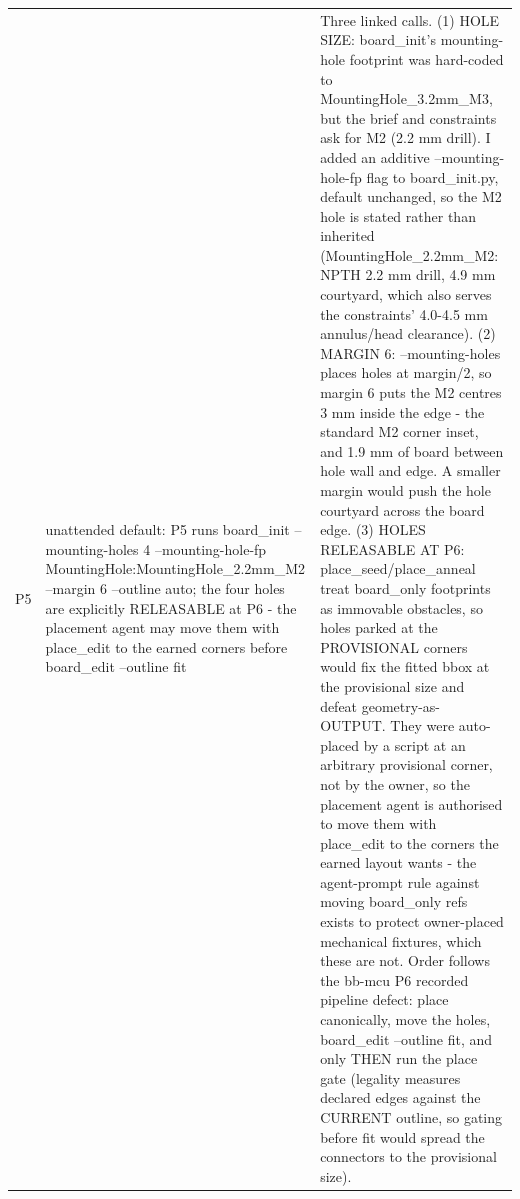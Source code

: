 \documentclass[11pt,a4paper]{article}
\begin{document}
{\begin{longtable}{lp{5.2cm}p{7.2cm}}
P5 & unattended default: P5 runs board\_init --mounting-holes 4 --mounting-hole-fp MountingHole:MountingHole\_2.2mm\_M2 --margin 6 --outline auto; the four holes are explicitly RELEASABLE at P6 - the placement agent may move them with place\_edit to the earned corners before board\_edit --outline fit & Three linked calls. (1) HOLE SIZE: board\_init's mounting-hole footprint was hard-coded to MountingHole\_3.2mm\_M3, but the brief and constraints ask for M2 (2.2 mm drill). I added an additive --mounting-hole-fp flag to board\_init.py, default unchanged, so the M2 hole is stated rather than inherited (MountingHole\_2.2mm\_M2: NPTH 2.2 mm drill, 4.9 mm courtyard, which also serves the constraints' 4.0-4.5 mm annulus/head clearance). (2) MARGIN 6: --mounting-holes places holes at margin/2, so margin 6 puts the M2 centres 3 mm inside the edge - the standard M2 corner inset, and 1.9 mm of board between hole wall and edge. A smaller margin would push the hole courtyard across the board edge. (3) HOLES RELEASABLE AT P6: place\_seed/place\_anneal treat board\_only footprints as immovable obstacles, so holes parked at the PROVISIONAL corners would fix the fitted bbox at the provisional size and defeat geometry-as-OUTPUT. They were auto-placed by a script at an arbitrary provisional corner, not by the owner, so the placement agent is authorised to move them with place\_edit to the corners the earned layout wants - the agent-prompt rule against moving board\_only refs exists to protect owner-placed mechanical fixtures, which these are not. Order follows the bb-mcu P6 recorded pipeline defect: place canonically, move the holes, board\_edit --outline fit, and only THEN run the place gate (legality measures declared edges against the CURRENT outline, so gating before fit would spread the connectors to the provisional size). \\

\end{longtable}}
\end{document}
